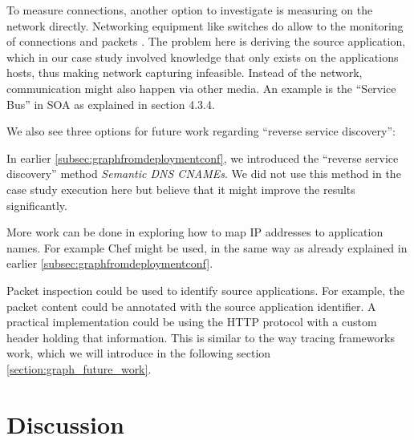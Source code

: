 To measure connections, another option to investigate is measuring on the network directly. Networking equipment like switches do allow to the monitoring of connections and packets \cite{Hogg}. The problem here is deriving the source application, which in our case study involved knowledge that only exists on the applications hosts, thus making network capturing infeasible. Instead of the network, communication might also happen via other media. An example is the ``Service Bus'' in SOA as explained in \cite{enterpriseSOA} section 4.3.4.

We also see three options for future work regarding ``reverse service discovery'':
\begin{titemize}
  \item In earlier \ref{subsec:graphfromdeploymentconf}, we introduced the ``reverse service discovery'' method \emph{Semantic DNS CNAMEs}. We did not use this method in the case study execution here but believe that it might improve the results significantly.
  \item More work can be done in exploring how to map IP addresses to application names. For example Chef might be used, in the same way as already explained in earlier \ref{subsec:graphfromdeploymentconf}.
  \item Packet inspection could be used to identify source applications. For example, the packet content could be annotated with the source application identifier. A practical implementation could be using the HTTP protocol with a custom header holding that information. This is similar to the way tracing frameworks work, which we will introduce in the following section \ref{section:graph_future_work}.
\end{titemize}

\section{Discussion}

